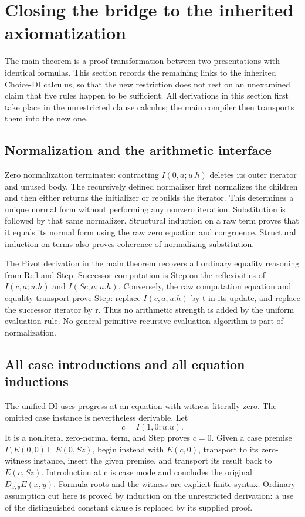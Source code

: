 \documentclass[11pt,letterpaper]{article}
\theoremstyle{definition}
\begin{document}
\section{Closing the bridge to the inherited axiomatization}
\label{sec:closing-bridge}

The main theorem is a proof transformation between two presentations
with identical formulas. This section records the remaining links to
the inherited Choice-DI calculus, so that the new restriction does not
rest on an unexamined claim that five rules happen to be sufficient.
All derivations in this section first take place in the unrestricted
clause calculus; the main compiler then transports them into the new one.

\subsection{Normalization and the arithmetic interface}

Zero normalization terminates: contracting \(I(0,a;u.h)\) deletes its
outer iterator and unused body. The recursively defined normalizer
first normalizes the children and then either returns the initializer
or rebuilds the iterator. This determines a unique normal form without
performing any nonzero iteration. Substitution is followed by that same
normalizer. Structural induction on a raw term proves that it equals
its normal form using the raw zero equation and congruence. Structural
induction on terms also proves coherence of normalizing substitution.

The Pivot derivation in the main theorem recovers all ordinary equality
reasoning from Refl and Step. Successor computation is Step on the
reflexivities of \(I(c,a;u.h)\) and \(I(Sc,a;u.h)\). Conversely,
the raw computation equation and equality transport prove Step:
replace \(I(c,a;u.h)\) by t in its update, and replace the successor
iterator by r. Thus no arithmetic strength is added by the uniform
evaluation rule. No general primitive-recursive evaluation algorithm
is part of normalization.

\subsection{All case introductions and all equation inductions}

The unified DI uses progress at an equation with witness literally zero.
The omitted case instance is nevertheless derivable. Let
\[
 c=I(1,0;u.u).
\]
It is a nonliteral zero-normal term, and Step proves \(c=0\). Given a
case premise \(\Gamma,E(0,0)\vdash E(0,Sz)\), begin instead with
\(E(c,0)\), transport to its zero-witness instance, insert the given
premise, and transport its result back to \(E(c,Sz)\). Introduction at
c is case mode and concludes the original \(D_{x,y}E(x,y)\). Formula
roots and the witness are explicit finite syntax. Ordinary-assumption
cut here is proved by induction on the unrestricted derivation: a use
of the distinguished constant clause is replaced by its supplied proof.
\end{document}
